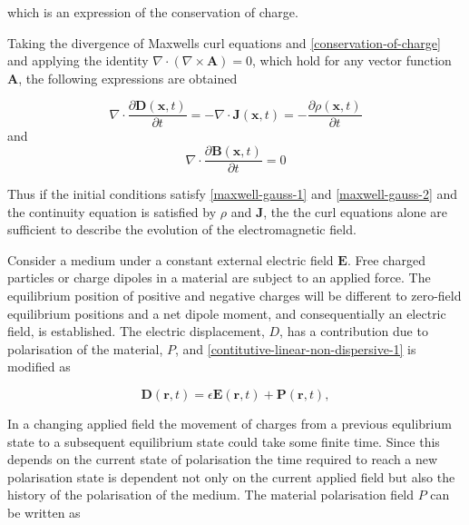which is an expression of the conservation of charge.

Taking the divergence of Maxwells curl equations and \eqref{conservation-of-charge} and applying the identity $\nabla \cdot ( \nabla \times \mathbf{A} ) = 0 $, which hold for any vector function $\mathbf{A}$, the following expressions are obtained

$$
\nabla \cdot \frac{\partial \mathbf{D}(\mathbf{x}, t)}{\partial t} = - \nabla \cdot \mathbf{J}(\mathbf{x},t) = - \frac{\partial \rho (\mathbf{x},t)}{\partial t}
$$
and
$$
\nabla \cdot \frac{\partial \mathbf{B}(\mathbf{x}, t)}{\partial t} = 0
$$

Thus if the initial conditions satisfy \eqref{maxwell-gauss-1} and \eqref{maxwell-gauss-2} and the continuity equation is satisfied by $\rho$ and $\mathbf{J}$, the the curl equations alone are sufficient to describe the evolution of the electromagnetic field.



Consider a medium under a constant external electric field $\mathbf{E}$. Free charged particles or charge dipoles in a material are subject to an applied force. The equilibrium position of positive and negative charges will be different to zero-field equilibrium positions and a net dipole moment, and consequentially an electric field, is established. The electric displacement, $D$, has a contribution due to polarisation of the material, $P$, and \eqref{contitutive-linear-non-dispersive-1} is modified as

$$
\mathbf{D}(\mathbf{r},t) = \epsilon \mathbf{E}(\mathbf{r},t) + \mathbf{P}(\mathbf{r},t) ,
$$

In a changing applied field the movement of charges from a previous equlibrium state to a subsequent equilibrium state could take some finite time. Since this depends on the current state of polarisation the time required to reach a new polarisation state is dependent not only on the current applied field but also the history of the polarisation of the medium. The material polarisation field $P$ can be written as

